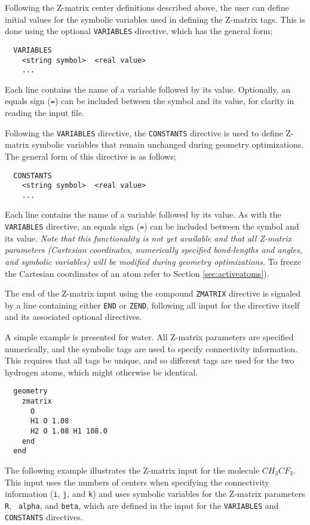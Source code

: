 Following the Z-matrix center definitions described above, the user can
 define initial values for the symbolic variables used in defining the
Z-matrix tags.  This is done using the optional  \verb+VARIABLES+ directive,
which has the general form;

\begin{verbatim}
  VARIABLES
    <string symbol>  <real value>
    ...
\end{verbatim}
Each line contains the name of a variable followed by its value.
Optionally, an equals sign (\verb+=+) can be included between the
symbol and its value, for clarity in reading the input file.

Following the \verb+VARIABLES+ directive, the \verb+CONSTANTS+
directive is used to define Z-matrix symbolic 
variables that remain unchanged during geometry optimizations.  The
general form of this directive is as follows;
\begin{verbatim}
  CONSTANTS
    <string symbol>  <real value>
    ...
\end{verbatim}
Each line contains the name of a variable followed by its value.
As with the \verb+VARIABLES+ directive, 
an equals sign (\verb+=+) can be included between the
symbol and its value.
{\em Note that this functionality is not yet available and that all
  Z-matrix parameters (Cartesian coordinates, numerically specified
  bond-lengths and angles, and symbolic variables) will be modified
  during geometry optimizations.}  To freeze the Cartesian coordinates
of an atom refer to Section \ref{sec:activeatoms}).

The end of the Z-matrix input using the compound \verb+ZMATRIX+
directive is signaled by a line containing either \verb+END+ or
\verb+ZEND+, following all input for the directive itself and its
associated optional directives.  

A simple example is presented for water.  All Z-matrix parameters are
specified numerically, and the symbolic tags are used to specify
connectivity information.  This requires that all tags be unique, and
so different tags are used for the two hydrogen atoms, which might 
otherwise be identical.
\begin{verbatim}
  geometry
    zmatrix 
      O
      H1 O 1.08
      H2 O 1.08 H1 108.0
    end
  end
\end{verbatim}

The following example illustrates the Z-matrix input for the molecule
$CH_3CF_3$.  This input uses the numbers of centers when specifying
the connectivity information (\verb+i+, \verb+j+, and \verb+k+) and
uses symbolic variables for the Z-matrix parameters {\tt R}, {\tt
  alpha}, and {\tt beta}, which are defined in the input for the
\verb+VARIABLES+ and
\verb+CONSTANTS+ directives.


